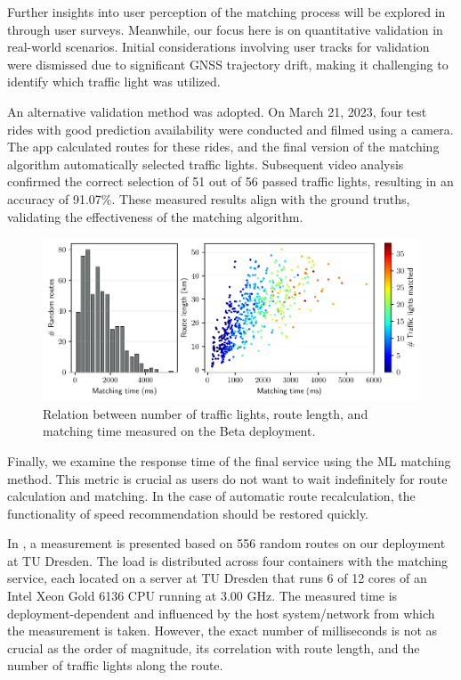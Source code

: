 Further insights into user perception of the matching process will be explored in  through user surveys. Meanwhile, our focus here is on quantitative validation in real-world scenarios. Initial considerations involving user tracks for validation were dismissed due to significant GNSS trajectory drift, making it challenging to identify which traffic light was utilized.

An alternative validation method was adopted. On March 21, 2023, four test rides with good prediction availability were conducted and filmed using a camera. The app calculated routes for these rides, and the final version of the matching algorithm automatically selected traffic lights. Subsequent video analysis confirmed the correct selection of 51 out of 56 passed traffic lights, resulting in an accuracy of 91.07\%. These measured results align with the ground truths, validating the effectiveness of the matching algorithm.

\begin{figure}[t]
\centering 
\includegraphics[width=\linewidth]{images/matching-performance-556-routes.pdf}
\caption{Relation between number of traffic lights, route length, and matching time measured on the Beta deployment.}
\label{fig:matching-performance}
\end{figure}

Finally, we examine the response time of the final service using the ML matching method. This metric is crucial as users do not want to wait indefinitely for route calculation and matching. In the case of automatic route recalculation, the functionality of speed recommendation should be restored quickly.

In , a measurement is presented based on 556 random routes on our deployment at TU Dresden. The load is distributed across four containers with the matching service, each located on a server at TU Dresden that runs 6 of 12 cores of an Intel Xeon Gold 6136 CPU running at 3.00 GHz. The measured time is deployment-dependent and influenced by the host system/network from which the measurement is taken. However, the exact number of milliseconds is not as crucial as the order of magnitude, its correlation with route length, and the number of traffic lights along the route.

